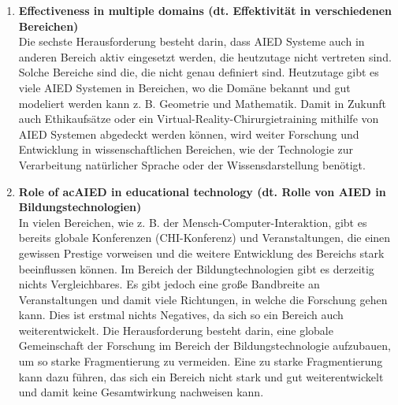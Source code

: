 \begin{enumerate}
      \item \textbf{Effectiveness in multiple domains (dt. Effektivität in verschiedenen Bereichen)} \\
            Die sechste Herausforderung besteht darin, dass AIED Systeme auch in anderen Bereich aktiv eingesetzt werden, die heutzutage nicht vertreten sind. Solche Bereiche sind die, die nicht genau definiert sind.
            Heutzutage gibt es viele AIED Systemen in Bereichen, wo die Domäne bekannt und gut modeliert werden kann z. B. Geometrie und Mathematik.
            Damit in Zukunft auch Ethikaufsätze oder ein Virtual-Reality-Chirurgietraining mithilfe von AIED Systemen abgedeckt werden können, wird weiter Forschung und Entwicklung in  wissenschaftlichen Bereichen, wie der Technologie zur Verarbeitung natürlicher Sprache oder der Wissensdarstellung benötigt. \cite[S. 11f]{Pinkwart.2016}


      \item \textbf{Role of ac{AIED} in educational technology (dt. Rolle von \ac{AIED} in Bildungstechnologien)} \\
            In vielen Bereichen, wie z. B. der Mensch-Computer-Interaktion, gibt es bereits globale Konferenzen (CHI-Konferenz) und Veranstaltungen, die einen gewissen Prestige vorweisen und die weitere Entwicklung des Bereichs stark beeinflussen können.
            Im Bereich der Bildungtechnologien gibt es derzeitig nichts Vergleichbares.
            Es gibt jedoch eine große Bandbreite an Veranstaltungen und damit viele Richtungen, in welche die Forschung gehen kann.
            Dies ist erstmal nichts Negatives, da sich so ein Bereich auch weiterentwickelt.
            Die Herausforderung besteht darin, eine globale Gemeinschaft der Forschung im Bereich der Bildungstechnologie aufzubauen, um so starke Fragmentierung zu vermeiden.
            Eine zu starke Fragmentierung kann dazu führen, das sich ein Bereich nicht stark und gut weiterentwickelt und damit keine Gesamtwirkung nachweisen kann. \cite[S. 12]{Pinkwart.2016}

\end{enumerate}